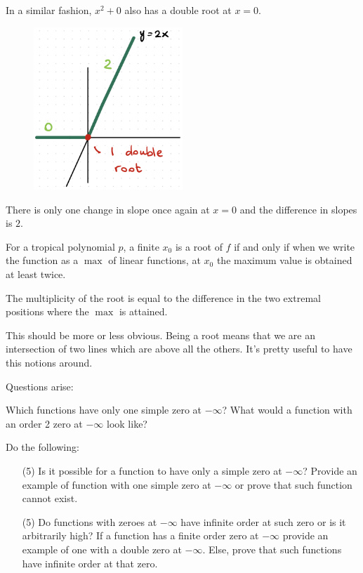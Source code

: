 \documentclass[12pt]{memoir}
\begin{document}
\begin{Ex}
    In a similar fashion, $x^2+0$ also has a double root at $x=0$.
    \begin{figure}[h!]
        \centering
        \includegraphics[width=0.5\textwidth]{figs/fig3-6DoubleRootTropicalPolynomial2.png}
        \label{fig:3.6-DoubleRoot6}
    \end{figure}
    There is only one change in slope once again at $x=0$ and the difference in slopes is $2$.
\end{Ex}

\begin{Lem}
For a tropical polynomial $p$, a finite $x_0$ is a root of $f$ if and only if when we write the function as a $\max$ of linear functions, at $x_0$ the maximum value is obtained at least twice.\par 
The multiplicity of the root is equal to the difference in the two extremal positions where the $\max$ is attained.
\end{Lem}

This should be more or less obvious. Being a root means that we are an intersection of two lines which are above all the others. It's pretty useful to have this notions around.

Questions arise:
\begin{significant}
    Which functions have only one simple zero at $-\infty$? What would a function with an order 2 zero at $-\infty$ look like?
\end{significant}

\begin{Ej}
    Do the following:
    \begin{itemize}
        \item[(5)] Is it possible for a function to have only a simple zero at $-\infty$? Provide an example of function with one simple zero at $-\infty$ or prove that such function cannot exist. 
        \item[(5)] Do functions with zeroes at $-\infty$ have infinite order at such zero or is it arbitrarily high? If a function has a finite order zero at $-\infty$ provide an example of one with a double zero at $-\infty$. Else, prove that such functions have infinite order at that zero.
    \end{itemize}
\end{Ej}
\end{document}
